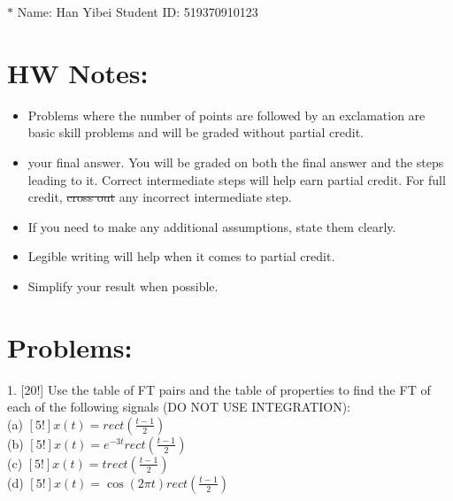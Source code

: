\documentclass[12pt,a4paper]{article}
\begin{document}
\noindent

\noindent{}

\begin{center}

\footnotesize{\color{blue}$*$ Name: Han Yibei \quad\quad\quad\quad\quad Student ID: 519370910123}
\end{center}

\section*{HW Notes:}
\begin{itemize}
    \item Problems where the number of points are followed by an exclamation are basic skill problems and will be graded without partial credit.
    \item {} your final answer. You will be graded on both the final answer and the steps leading to it. Correct intermediate steps will help earn partial credit.
    For full credit, \sout{cross out} any incorrect intermediate step.
    \item If you need to make any additional assumptions, state them clearly.
    \item Legible writing will help when it comes to partial credit.
    \item Simplify your result when possible.
\end{itemize}

\section*{Problems:}
\normalsize
\begin{tcolorbox}[colback = white]
1. [20!] Use the table of FT pairs and the table of properties to find the FT of each of the following signals (DO NOT USE INTEGRATION):\\
(a) $[5 !] x(t)={rect}\left(\frac{t-1}{2}\right)$\\
(b) $[5 !] x(t)=e^{-3 t} {rect}\left(\frac{t-1}{2}\right)$\\
(c) $[5 !] x(t)={trect}\left(\frac{t-1}{2}\right)$\\
(d) $[5 !] x(t)=\cos (2 \pi t) {rect}\left(\frac{t-1}{2}\right)$

\end{tcolorbox}
\end{document}
